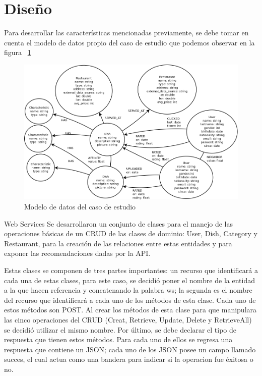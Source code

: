
  \section{Diseño}

    Para desarrollar las características mencionadas previamente, se debe tomar en cuenta el modelo de datos propio del caso de estudio que podemos observar en la figura ~\ref{fig:model_cs}

    \begin{landscape}
      \begin{figure}[h!]
        \centering
        \includegraphics[width=25cm]{./images/sc_data_model}
        \caption{Modelo de datos del caso de estudio}
        \label{fig:model_cs}
      \end{figure}
    \end{landscape}

  Web Services
  Se desarrollaron un conjunto de clases para el manejo de las operaciones básicas de un CRUD de las clases de dominio: User, Dish, Category y Restaurant, para la creación de las relaciones entre estas entidades y para exponer las recomendaciones dadas por la API.

  Estas clases se componen de tres partes importantes: un recurso que identificará a cada una de estas clases, para este caso, se decidió poner el nombre de la entidad a la que hacen referencia y concatenando la palabra ws; la segunda es el nombre del recurso que identificará a cada uno de los métodos de esta clase. Cada uno de estos métodos son POST. Al crear los métodos de esta clase para que manipulara las cinco operaciones del CRUD 
  (Creat, Retrieve, Update, Delete y RetrieveAll) se decidió utilizar el mismo nombre. Por último, se debe declarar el tipo de respuesta que tienen estos métodos. Para cada uno de ellos se regresa una respuesta que contiene un JSON; cada uno de los JSON posee un campo llamado succes, el cual actua como una bandera para indicar si la operacion fue éxitosa o no.

